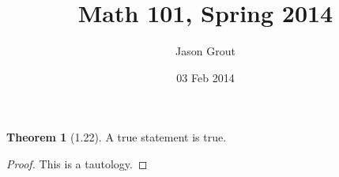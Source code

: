 \documentclass[11pt]{article}
\title{Math 101, Spring 2014}
\author{Jason Grout} %
\date{03 Feb 2014} %
\theoremstyle{definition}
\newtheorem{theorem}{Theorem}
\begin{document}
\maketitle

\begin{theorem}[1.22] %
A true statement is true.
\end{theorem}

\begin{proof}
This is a tautology.
\end{proof}
\end{document}
